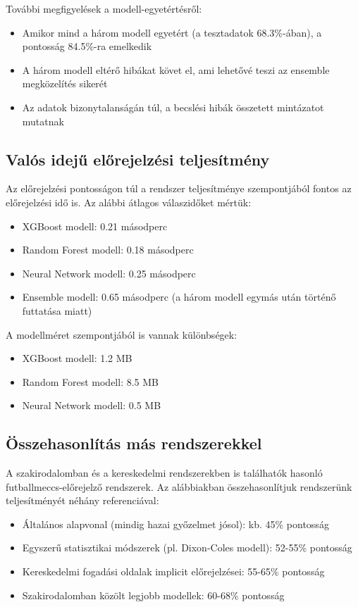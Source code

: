 További megfigyelések a modell-egyetértésről:
\begin{itemize}
    \item Amikor mind a három modell egyetért (a tesztadatok 68.3\%-ában), a pontosság 84.5\%-ra emelkedik
    \item A három modell eltérő hibákat követ el, ami lehetővé teszi az ensemble megközelítés sikerét
    \item Az adatok bizonytalanságán túl, a becslési hibák összetett mintázatot mutatnak
\end{itemize}

\subsection{Valós idejű előrejelzési teljesítmény}

Az előrejelzési pontosságon túl a rendszer teljesítménye szempontjából fontos az előrejelzési idő is. Az alábbi átlagos válaszidőket mértük:

\begin{itemize}
    \item XGBoost modell: 0.21 másodperc
    \item Random Forest modell: 0.18 másodperc
    \item Neural Network modell: 0.25 másodperc
    \item Ensemble modell: 0.65 másodperc (a három modell egymás után történő futtatása miatt)
\end{itemize}

A modellméret szempontjából is vannak különbségek:
\begin{itemize}
    \item XGBoost modell: 1.2 MB
    \item Random Forest modell: 8.5 MB
    \item Neural Network modell: 0.5 MB
\end{itemize}

\subsection{Összehasonlítás más rendszerekkel}

A szakirodalomban és a kereskedelmi rendszerekben is találhatók hasonló futballmeccs-előrejelző rendszerek. Az alábbiakban összehasonlítjuk rendszerünk teljesítményét néhány referenciával:

\begin{itemize}
    \item Általános alapvonal (mindig hazai győzelmet jósol): kb. 45\% pontosság
    \item Egyszerű statisztikai módszerek (pl. Dixon-Coles modell): 52-55\% pontosság
    \item Kereskedelmi fogadási oldalak implicit előrejelzései: 55-65\% pontosság
    \item Szakirodalomban közölt legjobb modellek: 60-68\% pontosság
\end{itemize}

